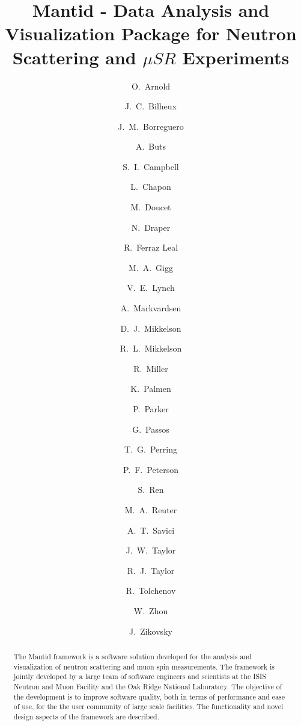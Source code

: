 \documentclass[1p]{elsarticle}
\begin{document}
\begin{frontmatter}



\title{Mantid - Data Analysis and Visualization Package for Neutron Scattering and $\mu SR$ Experiments}

\author[tessellaUK]{O.~Arnold}
\author[ornl]{J.~C.~Bilheux}
\author[ornl]{J.~M.~Borreguero}
\author[isis]{A.~Buts}
\author[ornl]{S.~I.~Campbell}
\author[ill]{L.~Chapon}
\author[ornl]{M.~Doucet}
\author[tessellaUK]{N.~Draper}
\author[ill]{R.~Ferraz Leal}
\author[tessellaUK]{M.~A.~Gigg}
\author[ornl]{V.~E.~Lynch}
\author[isis]{A.~Markvardsen}
\author[uws,ornl]{D.~J.~Mikkelson}
\author[uws,ornl]{R.~L.~Mikkelson}
\author[nccsornl]{R.~Miller}
\author[isis]{K.~Palmen}
\author[isis]{P.~Parker}
\author[isis]{G.~Passos}
\author[isis]{T.~G.~Perring}
\author[ornl]{P.~F.~Peterson}
\author[ornl]{S.~Ren}
\author[ornl]{M.~A.~Reuter}
\author[ornl]{A.~T.~Savici}
\let\thefootnote\relax{}
\author[isis]{J.~W.~Taylor}
\author[tessellaUS,ornl]{R.~J.~Taylor}
\author[tessellaUK]{R.~Tolchenov}
\author[ornl]{W.~Zhou}
\author[ornl]{J.~Zikovsky}

\address[tessellaUK]{Tessella Ltd., Abingdon, Oxfordshire, UK}
\address[ornl]{Neutron Data Analysis and Visualization, Oak Ridge National Laboratory, Oak~Ridge,~TN,~USA}

\address[isis]{ISIS Facility, Rutherford Appleton Laboratory, Chilton, Didcot, Oxfordshire, UK}
\address[ill]{Institut Laue-Langevin, Grenoble, France}
\address[uws]{University of Wisconsin-Stout, Menomonie, WI, USA}
\address[nccsornl]{Computing and Computational Science Directorate, Oak Ridge National Laboratory, Oak~Ridge,~TN,~USA}
\address[tessellaUS]{Tessella Inc., Newton, MA, USA}


\begin{abstract}
The Mantid framework is a software solution developed for the analysis and visualization of neutron scattering and muon spin measurements. The framework is jointly developed by a large team of software engineers and scientists at the ISIS Neutron and Muon Facility and the Oak Ridge National Laboratory.  The objective of the development is to improve software quality, both in terms of performance and ease of use, for the the user community of large scale facilities. 
The functionality and novel design aspects of the framework are described.
\end{abstract}


\end{frontmatter}
\end{document}
